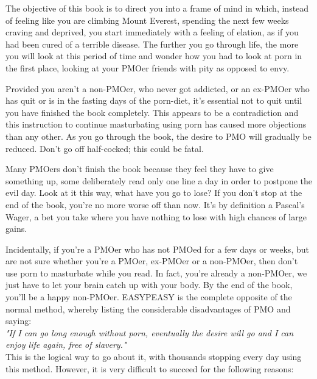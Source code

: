\documentclass[easypeasy.tex]{subfiles}
\begin{document}
The objective of this book is to direct you into a frame of mind in which, instead of feeling like you are climbing Mount Everest, spending the next few weeks craving and deprived, you start immediately with a feeling of elation, as if you had been cured of a terrible disease. The further you go through life, the more you will look at this period of time and wonder how you had to look at porn in the first place, looking at your PMOer friends with pity as opposed to envy.

Provided you aren't a non-PMOer, who never got addicted, or an ex-PMOer who has quit or is in the fasting days of the porn-diet, it's essential not to quit until you have finished the book completely. This appears to be a contradiction and this instruction to continue masturbating using porn has caused more objections than any other. As you go through the book, the desire to PMO will gradually be reduced. Don't go off half-cocked; this could be fatal.

Many PMOers don't finish the book because they feel they have to give something up, some deliberately read only one line a day in order to postpone the evil day. Look at it this way, what have you go to lose? If you don't stop at the end of the book, you're no more worse off than now. It's by definition a Pascal's Wager, a bet you take where you have nothing to lose with high chances of large gains.

Incidentally, if you're a PMOer who has not PMOed for a few days or weeks, but are not sure whether you're a PMOer, ex-PMOer or a non-PMOer, then don't use porn to masturbate while you read. In fact, you're already a non-PMOer, we just have to let your brain catch up with your body. By the end of the book, you'll be a happy non-PMOer. EASYPEASY is the complete opposite of the normal method, whereby listing the considerable disadvantages of PMO and saying:\\
\textit{"If I can go long enough without porn, eventually the desire will go and I can enjoy life again, free of slavery."}\\
This is the logical way to go about it, with thousands stopping every day using this method. However, it is very difficult to succeed for the following reasons:
\end{document}
